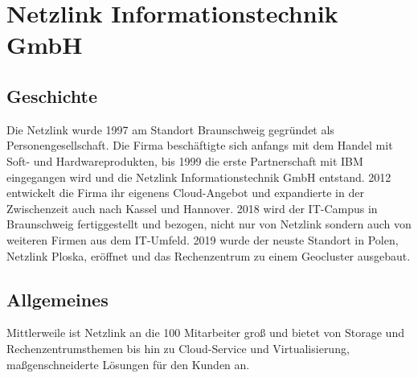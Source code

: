 \chapter{Netzlink Informationstechnik GmbH}
\label{app:netzlink}

\section{Geschichte} 
Die Netzlink wurde 1997 am Standort Braunschweig gegründet als Personengesellschaft. 
Die Firma beschäftigte sich anfangs mit dem Handel mit Soft- und Hardwareprodukten, bis 1999 die erste Partnerschaft mit IBM eingegangen wird und die Netzlink Informationstechnik GmbH entstand.
2012 entwickelt die Firma ihr eigenens Cloud-Angebot  und expandierte in der Zwischenzeit auch nach Kassel und Hannover. 
2018 wird der IT-Campus in Braunschweig fertiggestellt und bezogen, nicht nur von Netzlink sondern auch von weiteren Firmen aus dem IT-Umfeld. 
2019 wurde der neuste Standort in Polen, Netzlink Ploska, eröffnet und das Rechenzentrum zu einem Geocluster ausgebaut. 
\cite{Netzlink_history}

\section{Allgemeines}
Mittlerweile ist Netzlink an die 100 Mitarbeiter groß und bietet von Storage und Rechenzentrumsthemen bis hin zu Cloud-Service und Virtualisierung, maßgenschneiderte Lösungen für den Kunden an.
\cite{Netzlink_history}